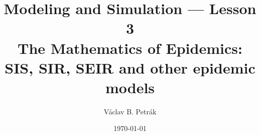 \documentclass[11pt]{beamer}
\title{
Modeling and Simulation --- Lesson 3\\
\textbf{The Mathematics of Epidemics:\\
SIS, SIR,  SEIR and other epidemic models}}
\author{Václav B. Petrák}
\institute{Faculty of Biomedical Engineering\\
Czech Technical University}
\date{\today}
\begin{document}
\begin{frame}
  \titlepage
\end{frame}




\end{document}
